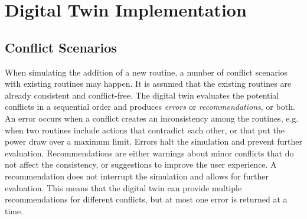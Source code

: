 \chapter{Digital Twin Implementation}\label{ch:implementation}

\section{Conflict Scenarios}

When simulating the addition of a new routine, a number of conflict scenarios with existing routines may happen. It is assumed that the existing routines are already consistent and conflict-free. The digital twin evaluates the potential conflicts in a sequential order and produces \textit{errors} or \textit{recommendations}, or both. An error occurs when a conflict creates an inconsistency among the routines, e.g. when two routines include actions that contradict each other, or that put the power draw over a maximum limit. Errors halt the simulation and prevent further evaluation. Recommendations are either warnings about minor conflicts that do not affect the consistency, or suggestions to improve the user experience. A recommendation does not interrupt the simulation and allows for further evaluation. This means that the digital twin can provide multiple recommendations for different conflicts, but at most one error is returned at a time.


